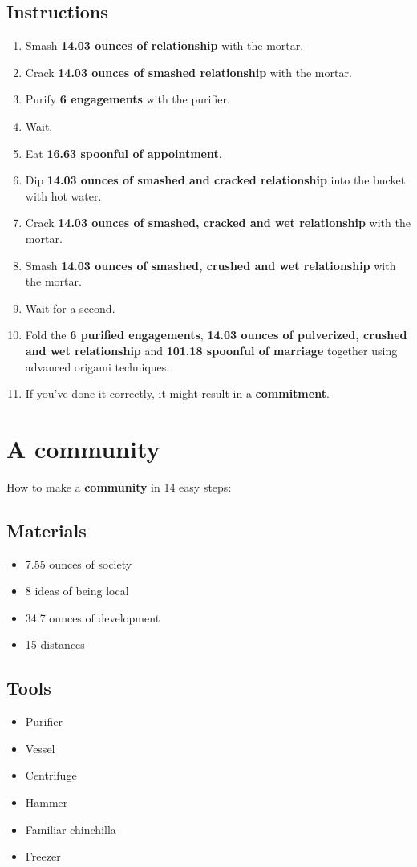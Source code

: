 \documentclass{article}
\begin{document}
\subsection{Instructions}\begin{enumerate}
\item 
Smash \textbf{14.03 ounces of relationship} with the mortar.
\item 
Crack \textbf{14.03 ounces of smashed relationship} with the mortar.
\item 
Purify \textbf{6 engagements} with the purifier.
\item 
Wait.
\item 
Eat \textbf{16.63 spoonful of appointment}.
\item 
Dip \textbf{14.03 ounces of smashed and cracked relationship} into the bucket with hot water.
\item 
Crack \textbf{14.03 ounces of smashed, cracked and wet relationship} with the mortar.
\item 
Smash \textbf{14.03 ounces of smashed, crushed and wet relationship} with the mortar.
\item 
Wait for a second.
\item 
Fold the \textbf{6 purified engagements}, \textbf{14.03 ounces of pulverized, crushed and wet relationship} and \textbf{101.18 spoonful of marriage} together using advanced origami techniques.
\item 
If you've done it correctly, it might result in a \textbf{commitment}.
\end{enumerate}
\newpage
\section{A community}How to make a \textbf{community} in 14 easy steps:

\subsection{Materials}\begin{itemize}
\item 
7.55 ounces of society
\item 
8 ideas of being local
\item 
34.7 ounces of development
\item 
15 distances
\end{itemize}
\subsection{Tools}\begin{itemize}
\item 
Purifier
\item 
Vessel
\item 
Centrifuge
\item 
Hammer
\item 
Familiar chinchilla
\item 
Freezer
\end{itemize}
\end{document}
